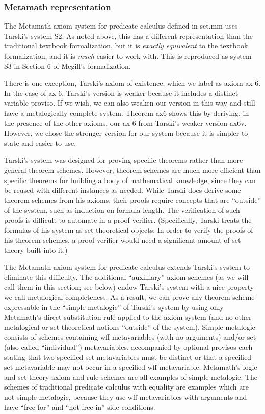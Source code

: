 \subsubsection{Metamath representation}

The Metamath axiom system for predicate calculus
defined in set.mm uses Tarski's system S2.
As noted above, this has a different representation
than the traditional textbook formalization,
but it is \textit{exactly equivalent} to the textbook formalization,
and it is \textit{much} easier to work with.
This is reproduced as system S3 in Section 6 of
Megill's formalization\cite{Megill}.

There is one exception, Tarski's axiom of existence,
which we label as axiom ax-6.
In the case of ax-6, Tarski's version is weaker because it includes a
distinct variable proviso. If we wish, we can also weaken our version
in this way and still have a metalogically complete system. Theorem
ax6 shows this by deriving, in the presence of the other axioms, our
ax-6 from Tarski's weaker version ax6v. However, we chose the stronger
version for our system because it is simpler to state and easier to use.

Tarski's system was designed for proving specific theorems rather than
more general theorem schemes. However, theorem schemes are much more
efficient than specific theorems for building a body of mathematical
knowledge, since they can be reused with different instances as
needed. While Tarski does derive some theorem schemes from his axioms,
their proofs require concepts that are ``outside'' of the system, such as
induction on formula length. The verification of such proofs is difficult
to automate in a proof verifier. (Specifically, Tarski treats the formulas
of his system as set-theoretical objects. In order to verify the proofs
of his theorem schemes, a proof verifier would need a significant amount
of set theory built into it.)

The Metamath axiom system for predicate calculus extends
Tarski's system to eliminate this difficulty. The additional
``auxilliary'' axiom
schemes (as we will call them in this section; see below) endow Tarski's
system with a nice property we call
metalogical completeness\cite[Remark 9.6]{Megill}.
As a result, we can prove any theorem scheme
expressable in the ``simple metalogic'' of Tarski's system by using
only Metamath's direct substitution rule applied to the axiom system
(and no other metalogical or set-theoretical notions ``outside'' of the
system). Simple metalogic consists of schemes containing wff metavariables
(with no arguments) and/or set (also called ``individual'') metavariables,
accompanied by optional provisos each stating that two specified set
metavariables must be distinct or that a specified set metavariable may
not occur in a specified wff metavariable. Metamath's logic and set theory
axiom and rule schemes are all examples of simple metalogic. The schemes
of traditional predicate calculus with equality are examples which are
not simple metalogic, because they use wff metavariables with arguments
and have ``free for'' and ``not free in'' side conditions.

